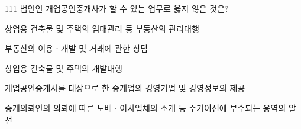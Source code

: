 \begin{question}{111}
법인인 개업공인중개사가 할 수 있는 업무로 옳지 않은 것은?
\begin{choices}
  \item 상업용 건축물 및 주택의 임대관리 등 부동산의 관리대행
  \item 부동산의 이용ㆍ개발 및 거래에 관한 상담
  \item 상업용 건축물 및 주택의 개발대행
  \item 개업공인중개사를 대상으로 한 중개업의 경영기법 및 경영정보의 제공
  \item 중개의뢰인의 의뢰에 따른 도배ㆍ이사업체의 소개 등 주거이전에 부수되는 용역의 알선
\end{choices}
\end{question}
